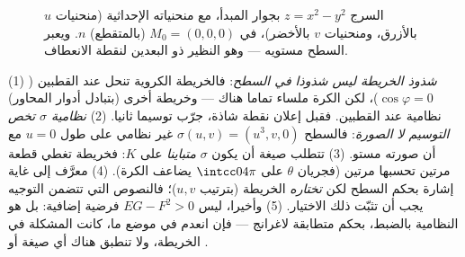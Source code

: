 \begin{figure}[ht]
\centering
{}
\caption{السرج $z = x^2 - y^2$ بجوار المبدأ، مع منحنياته الإحداثية (منحنيات
$u$ بالأزرق، ومنحنيات $v$ بالأخضر)،  في $M_0 = (0,0,0)$
(بالمتقطع)  $n$. ويعبر السطح مستويه  ---
وهو النظير ذو البعدين لنقطة الانعطاف.}
\label{fig:b2:surfaces:saddle}
\end{figure}

\begin{remark}
(1) \emph{شذوذ الخريطة ليس شذوذا في السطح}: فالخريطة الكروية تنحل
عند القطبين ($\cos\varphi = 0$)، لكن الكرة ملساء تماما هناك --- وخريطة أخرى
(بتبادل أدوار المحاور) نظامية عند القطبين. فقبل إعلان نقطة شاذة،
جرّب توسيما ثانيا. (2) \emph{نظامية $\sigma$ تخص التوسيم لا الصورة}:
فالسطح $\sigma(u, v) = (u^3, v,
0)$ غير نظامي على طول $u = 0$ مع أن صورته مستو. (3) تتطلب
صيغة  أن يكون $\sigma$ \emph{متباينا} على $K$: فخريطة تغطي
قطعة مرتين تحسبها مرتين (فجريان $\theta$ على $\intcc0{4\pi}$ يضاعف 
الكرة). (4)  معرَّف إلى غاية إشارة بحكم السطح لكن
\emph{تختاره} الخريطة (بترتيب $u, v$)؛ فالنصوص التي تتضمن التوجيه
يجب أن تثبّت ذلك الاختيار. (5) وأخيرا، ليس $EG - F^2 > 0$ فرضية إضافية: بل
هو النظامية بالضبط، بحكم متطابقة لاغرانج --- فإن انعدم في موضع ما،
كانت المشكلة في الخريطة، ولا تنطبق هناك أي صيغة  أو .
\end{remark}

